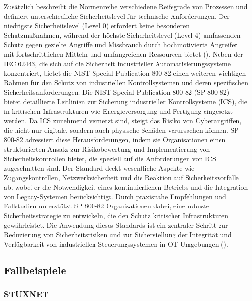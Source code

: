 Zusätzlich beschreibt die Normenreihe verschiedene Reifegrade von Prozessen und definiert unterschiedliche Sicherheitslevel für technische Anforderungen. Der niedrigste Sicherheitslevel (Level 0) erfordert keine besonderen Schutzmaßnahmen, während der höchste Sicherheitslevel (Level 4) umfassenden Schutz gegen gezielte Angriffe und Missbrauch durch hochmotivierte Angreifer mit fortschrittlichen Mitteln und umfangreichen Ressourcen bietet (\cite{ISecInsider}). Neben der IEC 62443, die sich auf die Sicherheit industrieller Automatisierungssysteme konzentriert, bietet die NIST Special Publication 800-82 einen weiteren wichtigen Rahmen für den Schutz von industriellen Kontrollsystemen und deren spezifischen Sicherheitsanforderungen. Die NIST Special Publication 800-82 (SP 800-82) bietet detaillierte Leitlinien zur Sicherung industrieller Kontrollsysteme (ICS), die in kritischen Infrastrukturen wie Energieversorgung und Fertigung eingesetzt werden. Da ICS zunehmend vernetzt sind, steigt das Risiko von Cyberangriffen, die nicht nur digitale, sondern auch physische Schäden verursachen können. SP 800-82 adressiert diese Herausforderungen, indem sie Organisationen einen strukturierten Ansatz zur Risikobewertung und Implementierung von Sicherheitskontrollen bietet, die speziell auf die Anforderungen von ICS zugeschnitten sind. Der Standard deckt wesentliche Aspekte wie Zugangskontrollen, Netzwerksicherheit und die Reaktion auf Sicherheitsvorfälle ab, wobei er die Notwendigkeit eines kontinuierlichen Betriebs und die Integration von Legacy-Systemen berücksichtigt. Durch praxisnahe Empfehlungen und Fallstudien unterstützt SP 800-82 Organisationen dabei, eine robuste Sicherheitsstrategie zu entwickeln, die den Schutz kritischer Infrastrukturen gewährleistet. Die Anwendung dieses Standards ist ein zentraler Schritt zur Reduzierung von Sicherheitsrisiken und zur Sicherstellung der Integrität und Verfügbarkeit von industriellen Steuerungssystemen in OT-Umgebungen (\cite{NIST}).

\subsection{Fallbeispiele}
\subsubsection{STUXNET}

